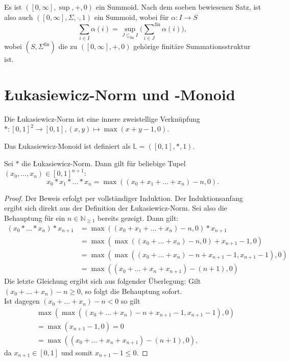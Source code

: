 \documentclass{article}
\begin{document}
\begin{example}
  Es ist $([0, \infty], \sup, +, 0)$ ein Summoid.
  Nach dem soeben bewiesenen Satz, ist also auch $([0, \infty], \Sigma, \cdot, 1)$ ein Summoid,
  wobei für $\alpha \colon I \to S$
  \begin{equation*}
    \sum_{i \in I} \alpha(i)
    = \sup_{J \subseteq_\text{fin} I} \bigg( {\sum_{i \in J}}^\text{fin} \alpha(i) \bigg),
  \end{equation*}
  wobei $(S, \Sigma^\text{fin})$ die zu $([0, \infty], +, 0)$ gehörige finitäre Summationsstruktur ist.
\end{example}

\newpage
\section{Łukasiewicz-Norm und -Monoid}

\begin{definition}
  Die Łukasiewicz-Norm ist eine innere zweistellige Verknüpfung $\ast \colon [0, 1]^2 \to [0, 1], (x, y) \mapsto \max(x+y-1, 0)$.

  Das Łukasiewicz-Monoid ist definiert als $\mathbb{L} = ([0, 1], \ast, 1)$.
\end{definition}

\begin{theorem}
  Sei $\ast$ die Łukasiewicz-Norm.
  Dann gilt für beliebige Tupel \\ $(x_0, \dots, x_n) \in [0, 1]^{n+1}$:
  \begin{equation*}
    x_0 \ast x_1 \ast \dots \ast x_n = \max((x_0 + x_1 + \dots + x_n) - n, 0).
  \end{equation*}
\end{theorem}
\begin{proof}
  Der Beweis erfolgt per vollständiger Induktion.
  Der Induktionsanfang ergibt sich direkt aus der Definition der Łukasiewicz-Norm.
  Sei also die Behauptung für ein $n \in \mathbb{N}_{\geq 1}$ bereits gezeigt.
  Dann gilt:
  \begin{align*}
    (x_0 \ast \dots \ast x_n) \ast x_{n+1} &= \max((x_0 + x_1 + \dots + x_n) - n, 0) \ast x_{n+1} \\
    &= \max(\max((x_0 + \dots + x_n) - n, 0) + x_{n+1} - 1, 0) \\
    &= \max(\max((x_0 + \dots + x_n) - n + x_{n+1} - 1, x_{n+1} - 1), 0) \\
    &= \max((x_0 + \dots + x_n + x_{n+1}) - (n + 1), 0)
  \end{align*}
  Die letzte Gleichung ergibt sich aus folgender Überlegung:
  Gilt \\ $(x_0 + \dots + x_n) - n \geq 0$,
  so folgt die Behauptung sofort. \\
  Ist dagegen $(x_0 + \dots + x_n) - n < 0$ so gilt 
  \begin{align*}
    &\max(\max((x_0 + \dots + x_n) - n + x_{n+1} - 1, x_{n+1} - 1), 0) \\
    &= \max(x_{n+1} - 1, 0) = 0 \\
    &= \max((x_0 + \dots + x_n + x_{n+1}) - (n + 1), 0),
  \end{align*}
  da $x_{n+1} \in [0, 1]$ und somit $x_{n+1} - 1 \leq 0$.
\end{proof}
\end{document}
